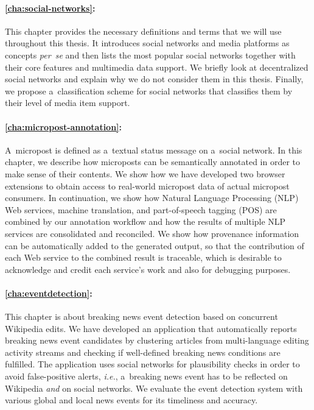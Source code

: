 \paragraph{\autoref{cha:social-networks}:}

This chapter provides the necessary definitions and terms
that we will use throughout this thesis.
It introduces social networks and media platforms as concepts
\emph{per~se} and then lists the most popular social networks
together with their core features and multimedia data support.
We briefly look at decentralized social networks and explain
why we do not consider them in this thesis.
Finally, we propose a~classification scheme for social networks
that classifies them by their level of media item support.

\paragraph{\autoref{cha:micropost-annotation}:}

A~micropost is defined as a~textual status message
on a~social network.
In this chapter, we describe how microposts can be semantically annotated
in order to make sense of their contents.
We show how we have developed two browser extensions to obtain access
to real-world micropost data of actual micropost consumers.
In continuation, we show how Natural Language Processing (NLP)
Web services, machine translation, and part-of-speech tagging (POS)
are combined by our annotation workflow
and how the results of multiple NLP services are consolidated and reconciled.
We show how provenance information can be automatically added
to the generated output, so that the contribution
of each Web service to the combined result is traceable,
which is desirable to acknowledge and credit each service's work
and also for debugging purposes.

\paragraph{\autoref{cha:eventdetection}:}

This chapter is about breaking news event detection
based on concurrent Wikipedia edits.
We have developed an application that automatically
reports breaking news event candidates by clustering
articles from multi-language editing activity streams
and checking if well-defined breaking news conditions are fulfilled.
The application uses social networks for plausibility checks
in order to avoid false-positive alerts,
\emph{i.e.}, a~breaking news event has to be reflected on Wikipedia
\emph{and} on social networks.
We evaluate the event detection system with various
global and local news events for its timeliness and accuracy.

